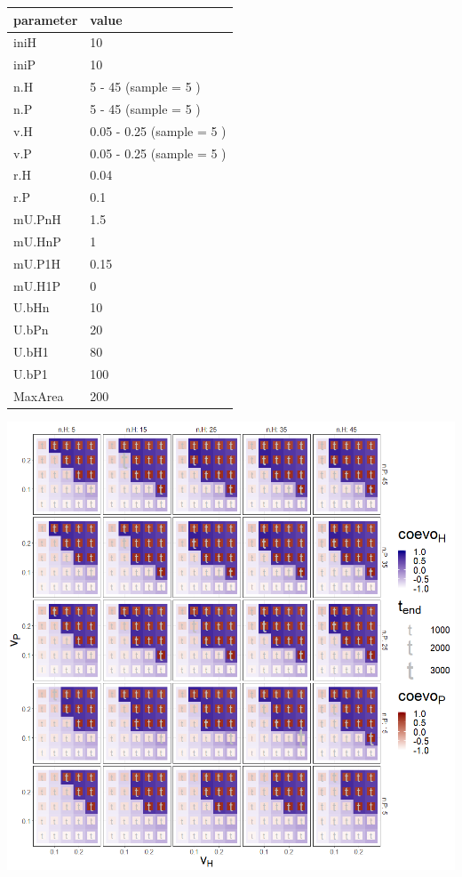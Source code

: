 \documentclass[]{book}
\begin{document}
\begin{tabular}{l|l}
\hline
parameter & value\\
\hline
iniH & 10\\
\hline
iniP & 10\\
\hline
n.H & 5 - 45 (sample = 5 )\\
\hline
n.P & 5 - 45 (sample = 5 )\\
\hline
v.H & 0.05 - 0.25 (sample = 5 )\\
\hline
v.P & 0.05 - 0.25 (sample = 5 )\\
\hline
r.H & 0.04\\
\hline
r.P & 0.1\\
\hline
mU.PnH & 1.5\\
\hline
mU.HnP & 1\\
\hline
mU.P1H & 0.15\\
\hline
mU.H1P & 0\\
\hline
U.bHn & 10\\
\hline
U.bPn & 20\\
\hline
U.bH1 & 80\\
\hline
U.bP1 & 100\\
\hline
MaxArea & 200\\
\hline
\end{tabular}

\newpage

\includegraphics[width=1\linewidth]{plots/4_fourPar-n-v_plot}
\end{document}

